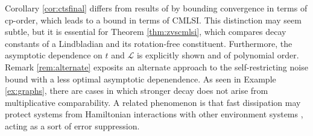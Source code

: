 \documentclass[accepted=2026-02-01, letterpaper]{quantumarticle}
\renewcommand{\L}{\mathcal{L}}
\begin{document}
Corollary \ref{cor:ctsfinal} differs from results of \cite{burgarth_quantum_2020} by bounding convergence in terms of cp-order, which leads to a bound in terms of CMLSI. This distinction may seem subtle, but it is essential for Theorem \ref{thm:zvscmlsi}, which compares decay constants of a Lindbladian and its rotation-free constituent. Furthermore, the asymptotic dependence on $t$ and $\L$ is explicitly shown and of polynomial order. Remark \ref{rem:alternate} exposits an alternate approach to the self-restricting noise bound with a less optimal asymptotic depenendence. As seen in Example \ref{ex:graphs}, there are cases in which stronger decay does not arise from multiplicative comparability. A related phenomenon is that fast dissipation may protect systems from Hamiltonian interactions with other environment systems \cite{erez_correcting_2004}, acting as a sort of error suppression.
\end{document}
